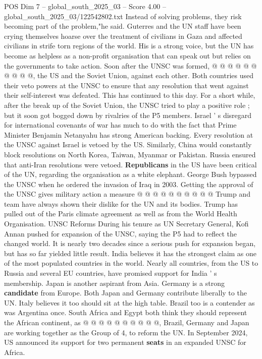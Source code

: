 \begin{textsample}{POS Dim 7 – global\_south\_2025\_03 – Score 4.00 – global\_south\_2025\_03/122542802.txt}
Instead of solving problems, they risk becoming part of the problem,"he said.
Guterres and the UN staff have been crying themselves hoarse over the treatment of civilians in Gaza and affected civilians in strife torn regions of the world.
His is a strong voice, but the UN has become as helpless as a non-profit organisation that can speak out but relies on the governments to take action.
Soon after the UNSC was formed, @ @ @ @ @ @ @ @ @ @, the US and the Soviet Union, against each other.
Both countries used their veto powers at the UNSC to ensure that any resolution that went against their self-interest was defeated.
This has continued to this day.
For a short while, after the break up of the Soviet Union, the UNSC tried to play a positive role ; but it soon got bogged down by rivalries of the P5 members.
Israel ' s disregard for international covenants of war has much to do with the fact that Prime Minister Benjamin Netanyahu has strong American backing.
Every resolution at the UNSC against Israel is vetoed by the US.
Similarly, China would constantly block resolutions on North Korea, Taiwan, Myanmar or Pakistan.
Russia ensured that anti-Iran resolutions were vetoed. \textbf{Republicans} in the US have been critical of the UN, regarding the organisation as a white elephant.
George Bush bypassed the UNSC when he ordered the invasion of Iraq in 2003.
Getting the approval of the UNSC gives military action a measure @ @ @ @ @ @ @ @ @ @ Trump and team have always shown their dislike for the UN and its bodies.
Trump has pulled out of the Paris climate agreement as well as from the World Health Organisation.
UNSC Reforms During his tenure as UN Secretary General, Kofi Annan pushed for expansion of the UNSC, saying the P5 had to reflect the changed world.
It is nearly two decades since a serious push for expansion began, but has so far yielded little result.
India believes it has the strongest claim as one of the most populated countries in the world.
Nearly all countries, from the US to Russia and several EU countries, have promised support for India ' s membership.
Japan is another aspirant from Asia.
Germany is a strong \textbf{candidate} from Europe.
Both Japan and Germany contribute liberally to the UN.
Italy believes it too should sit at the high table.
Brazil too is a contender as was Argentina once.
South Africa and Egypt both think they should represent the African continent, as @ @ @ @ @ @ @ @ @ @, Brazil, Germany and Japan are working together as the Group of 4, to reform the UN.
In September 2024, US announced its support for two permanent \textbf{seats} in an expanded UNSC for Africa.

\end{textsample}
